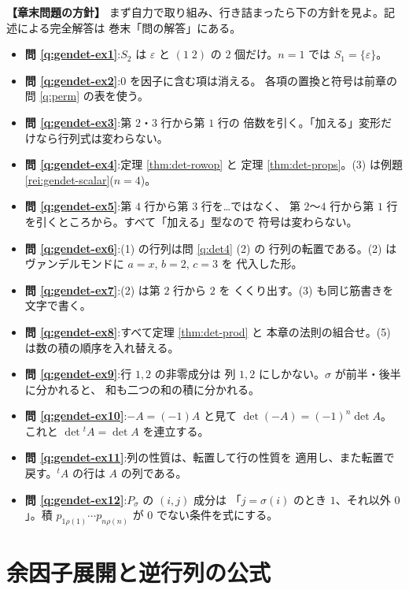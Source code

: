 \bigskip
{\small
\noindent\textbf{【章末問題の方針】}\quad
まず自力で取り組み、行き詰まったら下の方針を見よ。記述による完全解答は
巻末「問の解答」にある。
\begin{itemize}
\item \textbf{問 \ref{q:gendet-ex1}}:$S_2$ は $\varepsilon$ と $(1\;2)$ の
$2$ 個だけ。$n = 1$ では $S_1 = \{\varepsilon\}$。
\item \textbf{問 \ref{q:gendet-ex2}}:$0$ を因子に含む項は消える。
各項の置換と符号は前章の問 \ref{q:perm} の表を使う。
\item \textbf{問 \ref{q:gendet-ex3}}:第 $2$・$3$ 行から第 $1$ 行の
倍数を引く。「加える」変形だけなら行列式は変わらない。
\item \textbf{問 \ref{q:gendet-ex4}}:定理 \ref{thm:det-rowop} と
定理 \ref{thm:det-props}。(3) は例題 \ref{rei:gendet-scalar}($n = 4$)。
\item \textbf{問 \ref{q:gendet-ex5}}:第 $4$ 行から第 $3$ 行を…ではなく、
第 $2$〜$4$ 行から第 $1$ 行を引くところから。すべて「加える」型なので
符号は変わらない。
\item \textbf{問 \ref{q:gendet-ex6}}:(1) の行列は問 \ref{q:det4} (2) の
行列の転置である。(2) はヴァンデルモンドに $a = x$, $b = 2$, $c = 3$ を
代入した形。
\item \textbf{問 \ref{q:gendet-ex7}}:(2) は第 $2$ 行から $2$ を
くくり出す。(3) も同じ筋書きを文字で書く。
\item \textbf{問 \ref{q:gendet-ex8}}:すべて定理 \ref{thm:det-prod} と
本章の法則の組合せ。(5) は数の積の順序を入れ替える。
\item \textbf{問 \ref{q:gendet-ex9}}:行 $1, 2$ の非零成分は
列 $1, 2$ にしかない。$\sigma$ が前半・後半に分かれると、
和も二つの和の積に分かれる。
\item \textbf{問 \ref{q:gendet-ex10}}:$-A = (-1)A$ と見て
$\det(-A) = (-1)^n \det A$。これと $\det {}^t\!A = \det A$ を連立する。
\item \textbf{問 \ref{q:gendet-ex11}}:列の性質は、転置して行の性質を
適用し、また転置で戻す。${}^t\!A$ の行は $A$ の列である。
\item \textbf{問 \ref{q:gendet-ex12}}:$P_\sigma$ の $(i, j)$ 成分は
「$j = \sigma(i)$ のとき $1$、それ以外 $0$」。積
$p_{1\rho(1)} \cdots p_{n\rho(n)}$ が $0$ でない条件を式にする。
\end{itemize}
}

\chapter{余因子展開と逆行列の公式}\label{chap:cofactor}

